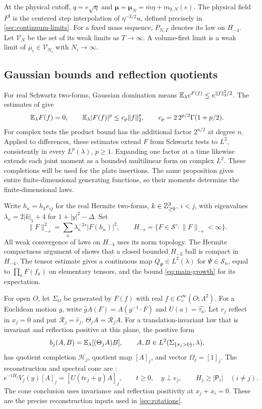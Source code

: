 At the physical cutoff, $q=e\sqrt\eta$ and
$\boldsymbol\mu=\boldsymbol\mu_N=\bar m\eta+m_{0,N}(e)$.
The physical field $F^\sharp$ is the centered step interpolation
of $\eta^{-3/2}u$, defined precisely in \cref{sec:continuum-limits}.
For a fixed mass sequence, $P_{N,T}$ denotes its law on $H_{-4}$.
Let $\mathcal V_N$ be the set of its weak limits as $T\to\infty$.
A volume-first limit is a weak limit of
$\mu_i\in\mathcal V_{N_i}$ with $N_i\to\infty$.

\subsection{Gaussian bounds and reflection quotients}\label{sec:probability}
For real Schwartz two-forms, Gaussian domination means
$\mathbb E_\lambda e^{F(f)}\le e^{\|f\|_2^2/2}$.
The estimates of \cite[Proposition~2.1]{ContinuumLimits} give
\[
 \mathbb E_\lambda F(f)=0,\qquad
 \mathbb E_\lambda|F(f)|^p\le c_p\|f\|_2^p,\qquad
 c_p=2\,2^{p/2}\Gamma(1+p/2).
\]
For complex tests the product bound has the additional factor
$2^{n/2}$ at degree $n$. Applied to differences, these estimates
extend $F$ from Schwartz tests to $L^2$, consistently in every
$L^p(\lambda)$, $p\ge1$. Expanding one factor at a time likewise
extends each joint moment as a bounded multilinear form on complex
$L^2$. These completions will be used for the plate insertions.
The same proposition gives entire finite-dimensional generating
functions, so their moments determine the finite-dimensional laws.

Write $h_\kappa=h_k e_{ij}$ for the real Hermite two-forms,
$k\in\mathbb Z_{\ge0}^3$, $i<j$, with eigenvalues
$\lambda_\kappa=2|k|_1+4$ for $1+|y|^2-\Delta$. Set
\[
 \|F\|_{-s}^2=\sum_\kappa\lambda_\kappa^{-2s}|F(h_\kappa)|^2,
 \qquad H_{-s}=\{F\in\mathcal S':\|F\|_{-s}<\infty\}.
\]
All weak convergence of laws on $H_{-4}$ uses its norm topology.
The Hermite compactness argument of \cite[Section~4]{ContinuumLimits}
shows that a closed bounded $H_{-3}$ ball is compact in $H_{-4}$.
The tensor estimate \cite[Proposition~6.1]{ContinuumLimits} gives a
continuous map $Q_\Psi\in L^2(\lambda)$ for $\Psi\in\mathcal S_n$,
equal to $\prod_aF(f_a)$ on elementary tensors, and the bound
\eqref{eq:main-growth} for its expectation.

For open $O$, let $\Sigma_O$ be generated by $F(f)$ with real
$f\in C_c^\infty(O;\Lambda^2)$. For a Euclidean motion $g$,
write $\widehat g A(F)=A(g^{-1}\cdot F)$ and $U(a)=\widehat{\tau_a}$.
Let $r_j$ reflect in $x_j=0$ and put
$\mathcal R_j=\widehat r_j$, $\Theta_j A=\overline{\mathcal R_jA}$.
For a translation-invariant law that is invariant and reflection
positive at this plane, the positive form
\[
 b_j(A,B)=\mathbb E_\lambda[(\Theta_jA)B],\qquad
 A,B\in L^2(\Sigma_{\{x_j>0\}},\lambda),
\]
has quotient completion $\mathcal H_j$, quotient map $[A]_j$,
and vector $\Omega_j=[1]_j$. The reconstruction and spectral cone
are \cite[Propositions~2.1 and~3.1]{ErgodicComponents}:
\[
 e^{-tH_j}V_j(y)[A]_j=[U(te_j+y)A]_j,\qquad
 t\ge0,\quad y\perp e_j,\qquad H_j\ge|\mathsf P_i|\quad(i\ne j).
\]
The cone conclusion uses invariance and reflection positivity at
$x_j+x_i=0$. These are the precise reconstruction inputs used in
\cref{sec:rotations}.

